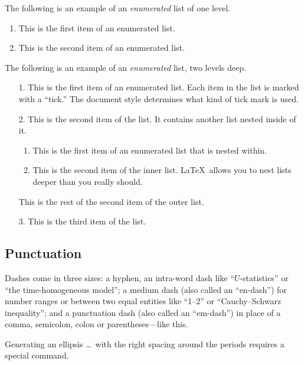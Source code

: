 \documentclass[aihp]{imsart}
\theoremstyle{plain}
\theoremstyle{remark}
\begin{document}
The following is an example of an \emph{enumerated} list of one level.

\begin{enumerate}
\item This is the first item of an enumerated list.
\item This is the second item of an enumerated list.
\end{enumerate}

The following is an example of an \emph{enumerated} list, two levels deep.
\begin{enumerate}
\item[1.]
This is the first item of an enumerated list.  Each item
in the list is marked with a ``tick.''  The document
style determines what kind of tick mark is used.
\item[2.]
This is the second item of the list.  It contains another
list nested inside of it.
\begin{enumerate}
\item
This is the first item of an enumerated list that
is nested within.
\item
This is the second item of the inner list.  \LaTeX\
allows you to nest lists deeper than you really should.
\end{enumerate}
This is the rest of the second item of the outer list.
\item[3.]
This is the third item of the list.
\end{enumerate}

\subsection{Punctuation}
Dashes come in three sizes: a hyphen, an intra-word dash like ``$U$-statistics'' or ``the time-homogeneous model'';
a medium dash (also called an ``en-dash'') for number ranges or between two equal entities like ``1--2'' or ``Cauchy--Schwarz inequality'';
and a punctuation dash (also called an ``em-dash'') in place of a comma, semicolon,
colon or parentheses---like this.

Generating an ellipsis \ldots\ with the right spacing
around the periods requires a special command.
\end{document}
